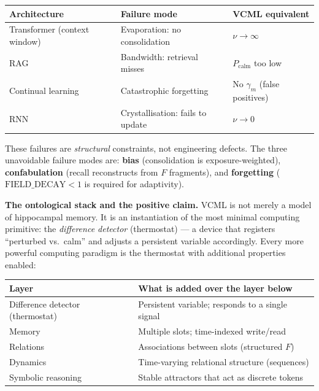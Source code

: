 \documentclass[11pt]{article}
\begin{document}
\begin{center}
\begin{tabular}{lll}
\toprule
Architecture & Failure mode & VCML equivalent \\
\midrule
Transformer (context window) & Evaporation: no consolidation     & $\nu \to \infty$ \\
RAG                          & Bandwidth: retrieval misses        & $P_\mathrm{calm}$ too low \\
Continual learning           & Catastrophic forgetting            & No $\gamma_m$ (false positives) \\
RNN                          & Crystallisation: fails to update   & $\nu \to 0$ \\
\bottomrule
\end{tabular}
\end{center}

These failures are \emph{structural} constraints, not engineering defects.
The three unavoidable failure modes are: \textbf{bias} (consolidation is exposure-weighted),
\textbf{confabulation} (recall reconstructs from $F$ fragments),
and \textbf{forgetting} ($\mathrm{FIELD\_DECAY} < 1$ is required for adaptivity).

\textbf{The ontological stack and the positive claim.}
VCML is not merely a model of hippocampal memory.
It is an instantiation of the most minimal computing primitive: the \emph{difference
detector} (thermostat) --- a device that registers ``perturbed vs.\ calm'' and
adjusts a persistent variable accordingly.
Every more powerful computing paradigm is the thermostat with additional properties enabled:

\begin{center}
\begin{tabular}{ll}
\toprule
Layer & What is added over the layer below \\
\midrule
Difference detector (thermostat) & Persistent variable; responds to a single signal \\
Memory                           & Multiple slots; time-indexed write/read \\
Relations                        & Associations between slots (structured $F$) \\
Dynamics                         & Time-varying relational structure (sequences) \\
Symbolic reasoning               & Stable attractors that act as discrete tokens \\
\bottomrule
\end{tabular}
\end{center}
\end{document}

